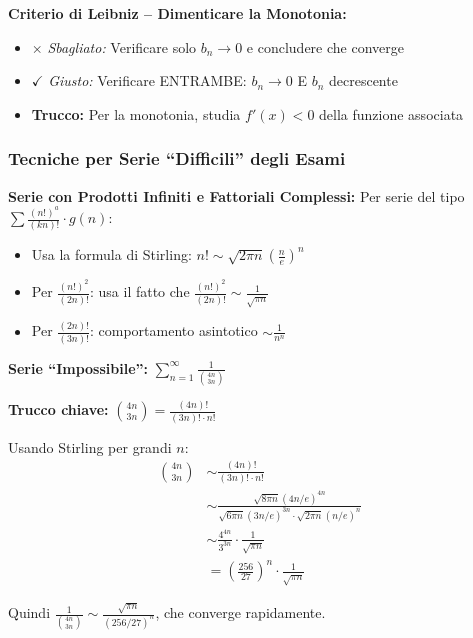 \begin{errore}
\textbf{Criterio di Leibniz -- Dimenticare la Monotonia:}
\begin{itemize}
    \item $\times$ \textit{Sbagliato:} Verificare solo $b_n \to 0$ e concludere che converge
    \item $\checkmark$ \textit{Giusto:} Verificare ENTRAMBE: $b_n \to 0$ E $b_n$ decrescente
    \item \textbf{Trucco:} Per la monotonia, studia $f'(x) < 0$ della funzione associata
\end{itemize}
\end{errore}

\subsubsection{Tecniche per Serie ``Difficili'' degli Esami}

\begin{info}
\textbf{Serie con Prodotti Infiniti e Fattoriali Complessi:}
Per serie del tipo \(\sum \frac{(n!)^a}{(kn)!} \cdot g(n)\):
\begin{itemize}
    \item Usa la formula di Stirling: \(n! \sim \sqrt{2\pi n}\left(\frac{n}{e}\right)^n\)
    \item Per \(\frac{(n!)^2}{(2n)!}\): usa il fatto che \(\frac{(n!)^2}{(2n)!} \sim \frac{1}{\sqrt{\pi n}}\)
    \item Per \(\frac{(2n)!}{(3n)!}\): comportamento asintotico \(\sim \frac{1}{n^n}\)
\end{itemize}
\end{info}

\begin{esempio}
\textbf{Serie ``Impossibile'':} \(\displaystyle\sum_{n=1}^{\infty} \frac{1}{\binom{4n}{3n}}\)

\textbf{Trucco chiave:} \(\binom{4n}{3n} = \frac{(4n)!}{(3n)! \cdot n!}\)

Usando Stirling per grandi \(n\):
\begin{align}
\binom{4n}{3n} &\sim \frac{(4n)!}{(3n)! \cdot n!} \\
&\sim \frac{\sqrt{8\pi n}{(4n/e)}^{4n}}{\sqrt{6\pi n}{(3n/e)}^{3n} \cdot \sqrt{2\pi n}{(n/e)}^n} \\
&\sim \frac{4^{4n}}{3^{3n}} \cdot \frac{1}{\sqrt{\pi n}} \\
&= \left(\frac{256}{27}\right)^n \cdot \frac{1}{\sqrt{\pi n}}
\end{align}

Quindi \(\frac{1}{\binom{4n}{3n}} \sim \frac{\sqrt{\pi n}}{{(256/27)}^n}\), che converge rapidamente.
\end{esempio}

